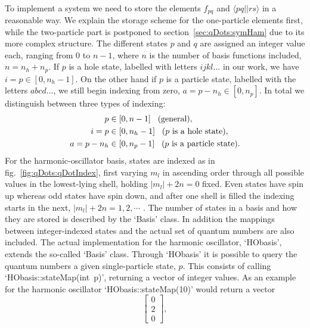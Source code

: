 \paragraph*{}
To implement a system we need to store the elements $f_{pq}$ and $\langle pq||rs \rangle$ in a reasonable way.
We explain the storage scheme for the one-particle elements first, while the two-particle part is postponed to section~\ref{sec:qDots:symHam} due to its more  complex structure.
The different states $p$ and $q$ are assigned an integer value each, ranging from $0$ to $n-1$, where $n$ is the number of basis functions included, $n=n_h+n_p$.
If $p$ is a hole state, labelled with letters $ijkl\dots$ in our work, we have $i = p \in [0,n_h-1]$.
On the other hand if $p$ is a particle state, labelled with the letters $abcd\dots$, we still begin indexing from zero, $a = p -n_h \in [0,n_p]$.
In total we distinguish between three types of indexing:
\begin{equation}
\begin{split}
p &\in [0,n-1] \hspace{3mm}\textrm{(general)} , \\
i = p &\in [0,n_h-1] \hspace{3mm}\textrm{($p$ is a hole state)} , \\
a = p- n_h &\in [0,n_p-1] \hspace{3mm}\textrm{($p$ is a particle state)} .
\end{split}
\end{equation}
For the harmonic-oscillator basis, states are indexed as in fig.~\ref{fig:qDots:qDotIndex}, first varying $m_l$ in ascending order through all possible values in the lowest-lying shell, holding $|m_l| + 2n = 0$ fixed.
Even states have spin up whereas odd states have spin down, and after one shell is filled the indexing starts in the next, $|m_l| + 2n = 1,2,\cdots$ .
The number of states in a basis and how they are stored is described by the `Basis' class.
In addition the mappings between integer-indexed states and the actual set of quantum numbers are also included.
The actual implementation for the harmonic oscillator, `HObasis', extends the so-called `Basis' class.
Through `HObasis' it is possible to query the quantum numbers a given single-particle state, $p$. This consists of calling \mbox{`HObasis::stateMap(int p)'}, returning a vector of integer values.
As an example for the harmonic oscillator \mbox{`HObasis::stateMap(10)'} would return a vector
\begin{equation}
\begin{bmatrix}
0 \\
2 \\
0
\end{bmatrix},
\end{equation}
